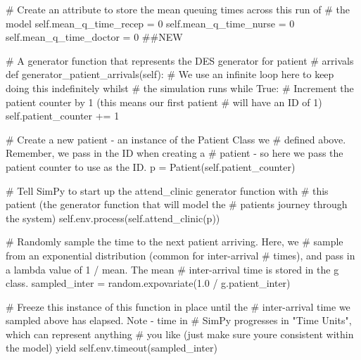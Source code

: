 \documentclass[
  letterpaper,
  DIV=11,
  numbers=noendperiod]{scrreprt}
\newenvironment{Shaded}{}{}
\newcommand{\CommentTok}[1]{\textcolor[rgb]{0.42,0.45,0.49}{#1}}
\newcommand{\ControlFlowTok}[1]{\textcolor[rgb]{0.84,0.23,0.29}{#1}}
\newcommand{\DecValTok}[1]{\textcolor[rgb]{0.00,0.36,0.77}{#1}}
\newcommand{\FloatTok}[1]{\textcolor[rgb]{0.00,0.36,0.77}{#1}}
\newcommand{\KeywordTok}[1]{\textcolor[rgb]{0.84,0.23,0.29}{#1}}
\newcommand{\NormalTok}[1]{\textcolor[rgb]{0.14,0.16,0.18}{#1}}
\newcommand{\OperatorTok}[1]{\textcolor[rgb]{0.14,0.16,0.18}{#1}}
\newcommand{\VariableTok}[1]{\textcolor[rgb]{0.89,0.38,0.04}{#1}}
\begin{document}
\begin{tcolorbox}
\begin{Shaded}
\begin{Highlighting}[]
        \CommentTok{\# Create an attribute to store the mean queuing times across this run of}
        \CommentTok{\# the model}
        \VariableTok{self}\NormalTok{.mean\_q\_time\_recep }\OperatorTok{=} \DecValTok{0}
        \VariableTok{self}\NormalTok{.mean\_q\_time\_nurse }\OperatorTok{=} \DecValTok{0}
        \VariableTok{self}\NormalTok{.mean\_q\_time\_doctor }\OperatorTok{=} \DecValTok{0} \CommentTok{\#\#NEW}

    \CommentTok{\# A generator function that represents the DES generator for patient}
    \CommentTok{\# arrivals}
    \KeywordTok{def}\NormalTok{ generator\_patient\_arrivals(}\VariableTok{self}\NormalTok{):}
        \CommentTok{\# We use an infinite loop here to keep doing this indefinitely whilst}
        \CommentTok{\# the simulation runs}
        \ControlFlowTok{while} \VariableTok{True}\NormalTok{:}
            \CommentTok{\# Increment the patient counter by 1 (this means our first patient}
            \CommentTok{\# will have an ID of 1)}
            \VariableTok{self}\NormalTok{.patient\_counter }\OperatorTok{+=} \DecValTok{1}

            \CommentTok{\# Create a new patient {-} an instance of the Patient Class we}
            \CommentTok{\# defined above.  Remember, we pass in the ID when creating a}
            \CommentTok{\# patient {-} so here we pass the patient counter to use as the ID.}
\NormalTok{            p }\OperatorTok{=}\NormalTok{ Patient(}\VariableTok{self}\NormalTok{.patient\_counter)}

            \CommentTok{\# Tell SimPy to start up the attend\_clinic generator function with}
            \CommentTok{\# this patient (the generator function that will model the}
            \CommentTok{\# patient\textquotesingle{}s journey through the system)}
            \VariableTok{self}\NormalTok{.env.process(}\VariableTok{self}\NormalTok{.attend\_clinic(p))}

            \CommentTok{\# Randomly sample the time to the next patient arriving.  Here, we}
            \CommentTok{\# sample from an exponential distribution (common for inter{-}arrival}
            \CommentTok{\# times), and pass in a lambda value of 1 / mean.  The mean}
            \CommentTok{\# inter{-}arrival time is stored in the g class.}
\NormalTok{            sampled\_inter }\OperatorTok{=}\NormalTok{ random.expovariate(}\FloatTok{1.0} \OperatorTok{/}\NormalTok{ g.patient\_inter)}

            \CommentTok{\# Freeze this instance of this function in place until the}
            \CommentTok{\# inter{-}arrival time we sampled above has elapsed.  Note {-} time in}
            \CommentTok{\# SimPy progresses in "Time Units", which can represent anything}
            \CommentTok{\# you like (just make sure you\textquotesingle{}re consistent within the model)}
            \ControlFlowTok{yield} \VariableTok{self}\NormalTok{.env.timeout(sampled\_inter)}


\end{Highlighting}
\end{Shaded}
\end{tcolorbox}
\end{document}
